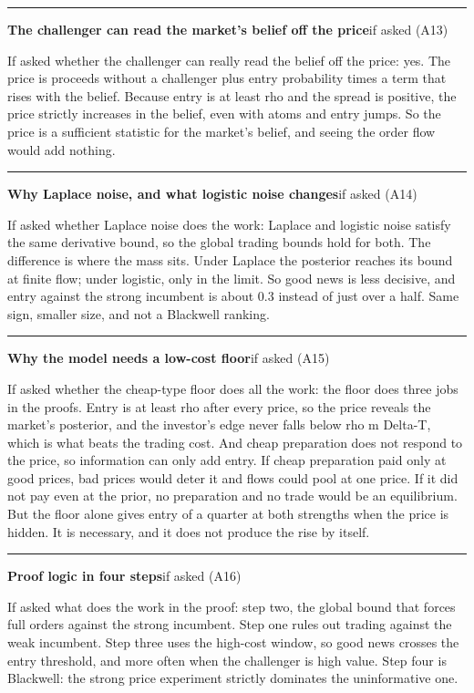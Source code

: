 \documentclass[11pt]{article}
\newcommand{\scriptframe}[3]{%
  \Needspace{9\baselineskip}%
  \par\medskip\noindent\textcolor{ScriptBlue}{\rule{\linewidth}{0.55pt}}%
  \par\smallskip\noindent
  \textbf{#1}\hfill\textcolor{ScriptGray}{\small #2}\par\smallskip
  #3\par}
\begin{document}
\scriptframe{The challenger can read the market's belief off the price}{if asked (A13)}{%
  If asked whether the challenger can really read the belief off the price: yes.
  The price is proceeds without a challenger plus entry probability times a term
  that rises with the belief. Because entry is at least rho and the spread is
  positive, the price strictly increases in the belief, even with atoms and
  entry jumps. So the price is a sufficient statistic for the market's belief,
  and seeing the order flow would add nothing.
}

\scriptframe{Why Laplace noise, and what logistic noise changes}{if asked (A14)}{%
  If asked whether Laplace noise does the work: Laplace and logistic noise
  satisfy the same derivative bound, so the global trading bounds hold for both.
  The difference is where the mass sits. Under Laplace the posterior reaches its
  bound at finite flow; under logistic, only in the limit. So good news is less
  decisive, and entry against the strong incumbent is about 0.3 instead of just
  over a half. Same sign, smaller size, and not a Blackwell ranking.
}

\scriptframe{Why the model needs a low-cost floor}{if asked (A15)}{%
  If asked whether the cheap-type floor does all the work: the floor does three jobs in the proofs. Entry is at least rho after every price, so the price reveals the market's posterior, and the investor's edge never falls below rho m Delta-T, which is what beats the trading cost. And cheap preparation does not respond to the price, so information can only add entry. If cheap preparation paid only at good prices, bad prices would deter it and flows could pool at one price. If it did not pay even at the prior, no preparation and no trade would be an equilibrium. But the floor alone gives entry of a quarter at both
  strengths when the price is hidden. It is necessary, and it does not produce
  the rise by itself.
}

\scriptframe{Proof logic in four steps}{if asked (A16)}{%
  If asked what does the work in the proof: step two, the global bound that
  forces full orders against the strong incumbent. Step one rules out trading
  against the weak incumbent. Step three uses the high-cost window, so good news
  crosses the entry threshold, and more often when the challenger is high value.
  Step four is Blackwell: the strong price experiment strictly dominates the
  uninformative one.
}
\end{document}
